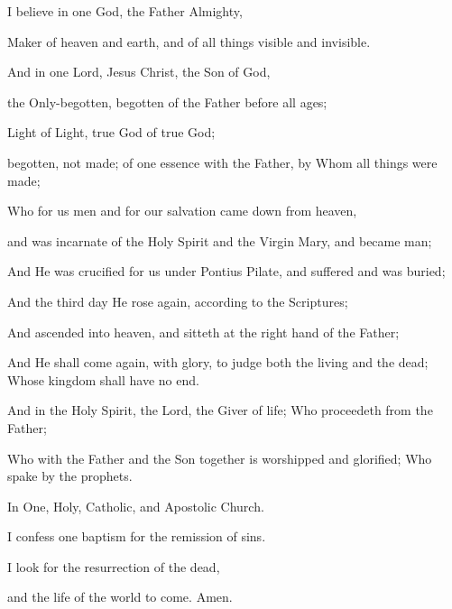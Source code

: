 \begin{liturgicaltext}
    \people I believe in one God, the Father Almighty,
    \item[] Maker of heaven and earth, and of all things visible and invisible.
    \item[] And in one Lord, Jesus Christ, the Son of God,
    \item[] the Only-begotten, begotten of the Father before all ages;
    \item[] Light of Light, true God of true God;
    \item[] begotten, not made; of one essence with the Father, by Whom all things were made;
    \item[] Who for us men and for our salvation came down from heaven,
    \item[] and was incarnate of the Holy Spirit and the Virgin Mary, and became man;
    \item[] And He was crucified for us under Pontius Pilate, and suffered and was buried;
    \item[] And the third day He rose again, according to the Scriptures;
    \item[] And ascended into heaven, and sitteth at the right hand of the Father;
    \item[] And He shall come again, with glory, to judge both the living and the dead; Whose kingdom shall have no end.
    \item[] And in the Holy Spirit, the Lord, the Giver of life; Who proceedeth from the Father;
    \item[] Who with the Father and the Son together is worshipped and glorified; Who spake by the prophets.
    \item[] In One, Holy, Catholic, and Apostolic Church.
    \item[] I confess one baptism for the remission of sins.
    \item[] I look for the resurrection of the dead,
    \item[] and the life of the world to come. Amen.
\end{liturgicaltext}